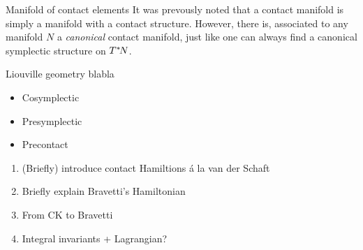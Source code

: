 \begin{mathbox}{Manifold of contact elements}
    It was prevously noted that a contact manifold is simply a manifold with a contact structure. However, there is, associated to any manifold $N$ a \emph{canonical} contact manifold, just like one can always find a canonical symplectic structure on $T^*\!N$.
\end{mathbox}

\begin{mathbox}{Liouville geometry}
    blabla
\end{mathbox}


\begin{itemize}
    \item Cosymplectic
    \item Presymplectic
    \item Precontact
\end{itemize}


\begin{enumerate}
    \item (Briefly) introduce contact Hamiltions á la van der Schaft 
    \item Briefly explain Bravetti's Hamiltonian
    \item From CK to Bravetti
    \item Integral invariants + Lagrangian?
\end{enumerate}

%
